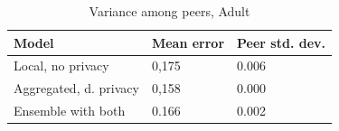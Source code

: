 \begin{table}[h]
	\centering
	\caption{Variance among peers, Adult}
	\label{table:peer_variance_adult}
	\begin{tabular}{|l|l|l|}
		\textbf{Model}                  & \textbf{Mean error} & \textbf{Peer std. dev.} \\
		\hline
		Local, no privacy      & 0,175 & 0.006 \\
		Aggregated, d. privacy & 0,158 & 0.000	 \\
		Ensemble with both & 0.166 & 0.002 \\
	\end{tabular}
\end{table}      





\cleardoublepage
